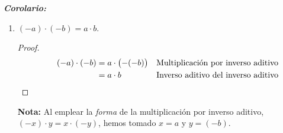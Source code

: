 \documentclass[11pt]{article}
\newcommand{\bfit}[1]{\textbf{\textit{#1}}}
\begin{document}
\begin{enumerate}[label=\alph*)]

    \bfit{Corolario:}
    \begin{enumerate}[label=\roman*)]
        \item $(-a)\cdot(-b)=a\cdot b$.%
        \begin{proof} 
            \begin{align*}
                \qquad (-a)\cdot (-b) &= a \cdot \bigl(-(-b)\bigr) && \text{Multiplicación por inverso aditivo}\\
                \qquad &= a \cdot b && \text{Inverso aditivo del inverso aditivo} \qedhere
            \end{align*}    
        \end{proof} \vspace{-1em}
        \textbf{Nota:} Al emplear la \textit{forma} de la multiplicación por inverso aditivo, $(-x)\cdot y = x \cdot (-y)$, hemos tomado $x=a$ y $y=(-b)$.

\end{enumerate}
\end{enumerate}
\end{document}
